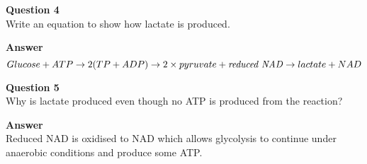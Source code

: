 \documentclass{article}
\begin{document}
\textbf{Question 4}\\
Write an equation to show how lactate is produced.

\textbf{Answer}\\
\[
	Glucose + ATP \rightarrow 2(TP + ADP) \rightarrow 2 \times pyruvate + \textrm{\textit{reduced NAD}} \rightarrow lactate + NAD
\]

\textbf{Question 5}\\
Why is lactate produced even though no ATP is produced from the reaction?

\textbf{Answer}\\
Reduced NAD is oxidised to NAD which allows glycolysis to continue under anaerobic conditions and produce some ATP.
\end{document}
